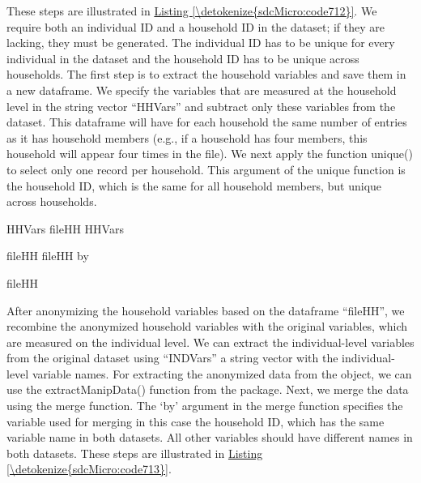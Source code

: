 \documentclass[letterpaper,10pt,english]{sphinxmanual}
\begin{document}
These steps are illustrated in \hyperref[\detokenize{sdcMicro:code712}]{Listing \ref{\detokenize{sdcMicro:code712}}}. We require both an
individual ID and a household ID in the dataset; if they are lacking,
they must be generated. The individual ID has to be unique for every
individual in the dataset and the household ID has to be unique across
households. The first step is to extract the household variables and
save them in a new dataframe. We specify the variables that are measured
at the household level in the string vector “HHVars” and subtract only
these variables from the dataset. This dataframe will have for each
household the same number of entries as it has household members (e.g.,
if a household has four members, this household will appear four times
in the file). We next apply the function unique() to select only one
record per household. This argument of the unique function is the
household ID, which is the same for all household members, but unique
across households.

\def\sphinxLiteralBlockLabel{\label{\detokenize{sdcMicro:code712}}}
%
\begin{sphinxVerbatim}[commandchars=\\\{\},numbers=left,firstnumber=1,stepnumber=1]
HHVars   
fileHH  \PYG{p}{[}HHVars\PYG{p}{]}

fileHH  fileHH by  

fileHH
\end{sphinxVerbatim}

After anonymizing the household variables based on the dataframe
“fileHH”, we recombine the anonymized household variables with the
original variables, which are measured on the individual level. We can
extract the individual-level variables from the original dataset using
“INDVars” \textendash{} a string vector with the individual-level variable names.
For extracting the anonymized data from the  object, we can
use the extractManipData() function from the  package. Next,
we merge the data using the merge function. The ‘by’ argument in the
merge function specifies the variable used for merging \textendash{} in this case
the household ID, which has the same variable name in both datasets. All
other variables should have different names in both datasets. These
steps are illustrated in \hyperref[\detokenize{sdcMicro:code713}]{Listing \ref{\detokenize{sdcMicro:code713}}}.
\end{document}
